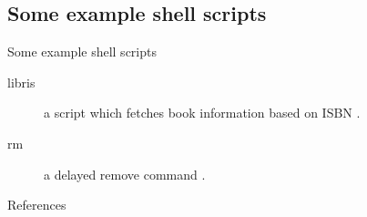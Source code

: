 \documentclass[handout]{beamer}
\begin{document}
\begin{comment}
\begin{frame}[fragile]{while-do}
	\begin{lstlisting}
$
	\end{lstlisting}
\end{frame}
\begin{frame}[fragile]{case}
	\begin{lstlisting}
$
	\end{lstlisting}
\end{frame}
\end{comment}

\subsection{Some example shell scripts}

\begin{frame}{Some example shell scripts}
	\begin{description}
		\item[libris] a script which fetches book information based on ISBN 
			\citep[for source see][]{Bosk2010libris}.

		\item[rm] a delayed remove command \citep[for source see][]{Bosk2012rm}.

	\end{description}
\end{frame}



\begin{frame}{References}
  
\end{frame}
\end{document}
